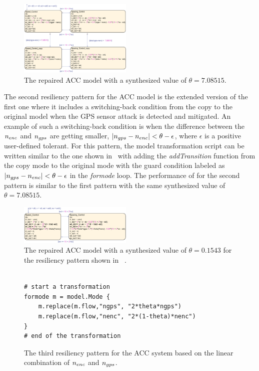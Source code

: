 \begin{figure}[t!]%
	\centering%
    \includegraphics[width=0.48\textwidth]{image/acc_model_pat1}%
	\caption{The repaired ACC model with a synthesized value of $\theta = 7.08515$.}%
\end{figure}%

The second resiliency pattern for the ACC model is the extended version of the first one where it includes a switching-back condition from the copy to the original model when the GPS sensor attack is detected and mitigated. An example of such a switching-back condition is when the difference between the $n_{enc}$ and $n_{gps}$ are getting smaller, \ie $|n_{gps} -n_{enc}| < \theta - \epsilon$, where $\epsilon$ is a positive user-defined tolerant. For this pattern, the model transformation script can be written similar to the one shown in~ with adding the \emph{addTransition} function from the copy mode to the original mode with the guard condition labeled as $|n_{gps} -n_{enc}| < \theta - \epsilon$ in the \emph{formode} loop.
%
The performance of \toolreaffirm for the second pattern is similar to the first pattern with the same synthesized value of $\theta = 7.08515$.

\begin{figure}[t!]%
	\centering%
    \includegraphics[width=0.48\textwidth]{image/acc_model_pat3}%
	\caption{The repaired ACC model with a synthesized value of $\theta = 0.1543$ for the resiliency pattern shown in ~.}%
\end{figure}%
%
\begin{figure}[tbp]%
\begin{lstlisting}[basicstyle=\ttfamily\footnotesize, numbers=none]

# start a transformation
formode m = model.Mode {
    m.replace(m.flow,"ngps", "2*theta*ngps")
    m.replace(m.flow,"nenc", "2*(1-theta)*nenc")
}
# end of the transformation
\end{lstlisting}
\caption{The third resiliency pattern for the ACC system based on the linear combination of $n_{enc}$ and $n_{gps}$.}%
%
\end{figure}


